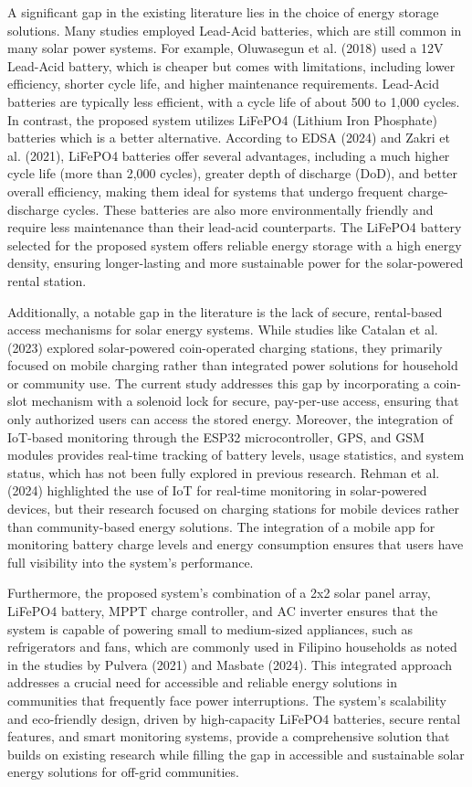 {A significant gap in the existing literature lies in the choice of energy storage solutions. Many studies employed Lead-Acid batteries, which are still common in many solar power systems. For example, Oluwasegun et al. (2018) used a 12V Lead-Acid battery, which is cheaper but comes with limitations, including lower efficiency, shorter cycle life, and higher maintenance requirements. Lead-Acid batteries are typically less efficient, with a cycle life of about 500 to 1,000 cycles. In contrast, the proposed system utilizes LiFePO4 (Lithium Iron Phosphate) batteries which is a better  alternative. According to EDSA (2024) and Zakri et al. (2021), LiFePO4 batteries offer several advantages, including a much higher cycle life (more than 2,000 cycles), greater depth of discharge (DoD), and better overall efficiency, making them ideal for systems that undergo frequent charge-discharge cycles. These batteries are also more environmentally friendly and require less maintenance than their lead-acid counterparts. The LiFePO4 battery selected for the proposed system offers reliable energy storage with a high energy density, ensuring longer-lasting and more sustainable power for the solar-powered rental station.

Additionally, a notable gap in the literature is the lack of secure, rental-based access mechanisms for solar energy systems. While studies like Catalan et al. (2023) explored solar-powered coin-operated charging stations, they primarily focused on mobile charging rather than integrated power solutions for household or community use. The current study addresses this gap by incorporating a coin-slot mechanism with a solenoid lock for secure, pay-per-use access, ensuring that only authorized users can access the stored energy. Moreover, the integration of IoT-based monitoring through the ESP32 microcontroller, GPS, and GSM modules provides real-time tracking of battery levels, usage statistics, and system status, which has not been fully explored in previous research. Rehman et al. (2024) highlighted the use of IoT for real-time monitoring in solar-powered devices, but their research focused on charging stations for mobile devices rather than community-based energy solutions. The integration of a mobile app for monitoring battery charge levels and energy consumption ensures that users have full visibility into the system’s performance.

Furthermore, the proposed system's combination of a 2x2 solar panel array, LiFePO4 battery, MPPT charge controller, and AC inverter ensures that the system is capable of powering small to medium-sized appliances, such as refrigerators and fans, which are commonly used in Filipino households as noted in the studies by Pulvera (2021) and Masbate (2024). This integrated approach addresses a crucial need for accessible and reliable energy solutions in communities that frequently face power interruptions. The system’s scalability and eco-friendly design, driven by high-capacity LiFePO4 batteries, secure rental features, and smart monitoring systems, provide a comprehensive solution that builds on existing research while filling the gap in accessible and sustainable solar energy solutions for off-grid communities.


}